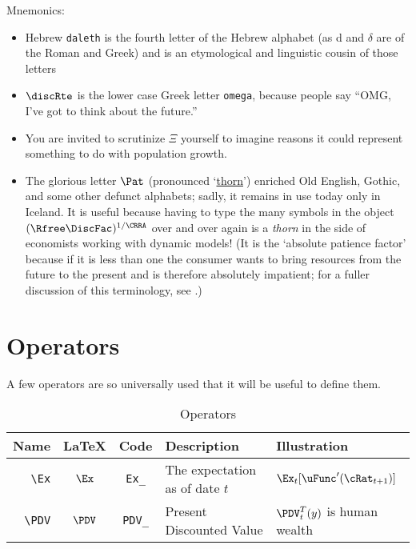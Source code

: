 \documentclass[12pt]{\econtex}
\begin{document}
Mnemonics:
\begin{itemize}
  \item Hebrew \texttt{daleth} is the fourth letter of the Hebrew alphabet (as d and $\delta$ are of the Roman and Greek) and is an etymological and linguistic cousin of those letters
  \item $\discRte$ is the lower case Greek letter \texttt{omega}, because people say ``OMG, I've got to think about the future.''
  \item You are invited to scrutinize $\Xi$ yourself to imagine reasons it could represent something to do with population growth.
  \item The glorious letter $\Pat$ (pronounced `\href{https://en.wikipedia.org/wiki/Thorn_(letter)}{thorn}') enriched Old English, Gothic, and some other defunct alphabets; sadly, it remains in use today only in Iceland.  It is useful because having to type the many symbols in the object $(\Rfree \DiscFac)^{1/\CRRA}$ over and over again is a \textit{thorn} in the side of economists working with dynamic models!  (It is the `absolute patience factor' because if it is less than one the consumer wants to bring resources from the future to the present and is therefore absolutely impatient; for a fuller discussion of this terminology, see \cite{carrollTractable}.)
\end{itemize}


\hypertarget{Operators}{}
\section{Operators}
A few operators are so universally used that it will be useful to define them.

\begin{table}[ht]
  \centering
  \begin{tabular}{|>{\ttfamily}rccll|}
    \hline
    Name       & \LaTeX & Code          & Description                    & Illustration
    \\ \hline
    \verb|\Ex| & $\Ex$  & \texttt{Ex\_} & The expectation as of date $t$ & $\Ex_{t}[\uFunc^{\prime}(\cRat_{t+1})]$
    \\   \verb|\PDV|        & $\PDV$       & \texttt{PDV\_} & Present Discounted Value & $\PDV_{t}^{T}(y)$ is human wealth
    \\	\hline
  \end{tabular}
  \caption{Operators}
  \label{table:Operators}
\end{table}
\end{document}

